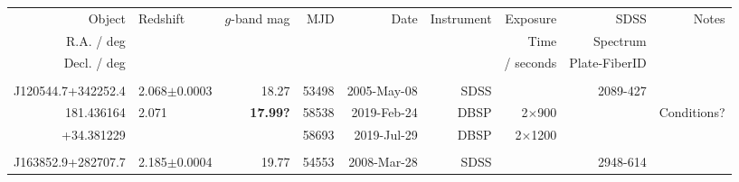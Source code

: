 \documentclass[a4paper,fleqn,usenatbib]{mnras}
\begin{document}
\begin{table}
  \centering
  \begin{tabular}{r  l  r r r   r r r r}
    \hline 
    \hline 
    Object                           & \multirow{3}{*}{Redshift}  & \multirow{3}{*}{$g$-band mag}      & \multirow{3}{*}{MJD} & \multirow{3}{*}{Date}  & \multirow{3}{*}{Instrument}  & Exposure      & SDSS                        & \multirow{3}{*}{Notes} \\
    R.A. / deg                     &                                         &                                                          &                                 &                                   &                                               &  Time           & Spectrum                 & \\
    Decl. / deg                   &                                         &                                                          &                                &                                     &                                              &  / seconds    & Plate-FiberID  & \\
    \hline  
                                         &                                         &                        &               &                            &                    &                             &                              & \\
    J120544.7+342252.4   & 2.068$\pm$0.0003         &   18.27             &  53498   &  2005-May-08   & SDSS             &                            & 2089-427             & \\
    181.436164                  & 2.071                              & {\bf 17.99?}     &  58538   &  2019-Feb-24    & DBSP            &  2$\times$900    &                               &  Conditions? \\
    +34.381229                 &                                        &                          &  58693   &  2019-Jul-29     & DBSP            &  2$\times$1200   &                              &   \\
                                         &                                       &                          &                &                          &                    &                                &                              & \\
    J163852.9+282707.7   & 2.185$\pm$0.0004       &   19.77              &  54553    & 2008-Mar-28     & SDSS           &                               &  2948-614              & \\

\end{tabular}
\end{table}
\end{document}
